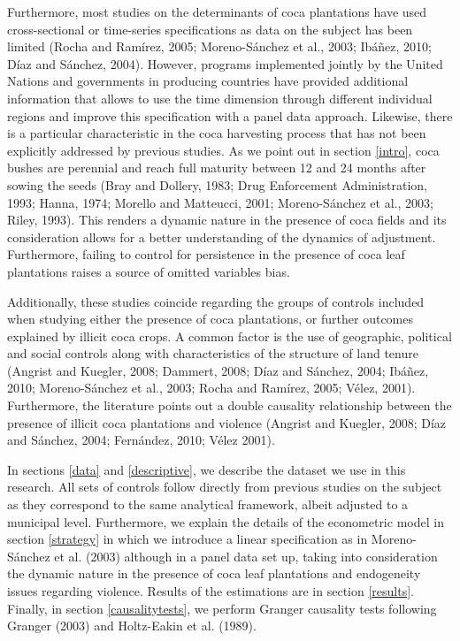 \documentclass[12pt,a4paper,english]{article}%
\begin{document}
Furthermore, most studies on the determinants of coca plantations have used cross-sectional or time-series specifications as data on the subject has been limited (Rocha and Ram\'{i}rez, 2005; Moreno-S\'{a}nchez et al., 2003; Ib\'{a}\~{n}ez, 2010; D\'{i}az and S\'{a}nchez, 2004). However, programs implemented jointly by the United Nations and governments in producing countries have provided additional information that allows to use the time dimension through different individual regions and improve this specification with a panel data approach. Likewise, there is a particular characteristic in the coca harvesting process that has not been explicitly addressed by previous studies. As we point out in section \ref{intro}, coca bushes are perennial and reach full maturity between 12 and 24 months after sowing the seeds (Bray and Dollery, 1983; Drug Enforcement Administration, 1993; Hanna, 1974; Morello and Matteucci, 2001; Moreno-S\'{a}nchez et al., 2003; Riley, 1993). This renders a dynamic nature in the presence of coca fields and its consideration allows for a better understanding of the dynamics of adjustment. Furthermore, failing to control for persistence in the presence of coca leaf plantations raises a source of omitted variables bias.

Additionally, these studies coincide regarding the groups of controls included when studying either the presence of coca plantations, or further outcomes explained by illicit coca crops. A common factor is the use of geographic, political and social controls along with characteristics of the structure of land tenure (Angrist and Kuegler, 2008; Dammert, 2008; D\'{i}az and S\'{a}nchez, 2004; Ib\'{a}\~{n}ez, 2010; Moreno-S\'{a}nchez et al., 2003; Rocha and Ram\'{i}rez, 2005; V\'{e}lez, 2001). Furthermore, the literature points out a double causality relationship between the presence of illicit coca plantations and violence (Angrist and Kuegler, 2008; D\'{i}az and S\'{a}nchez, 2004; Fern\'{a}ndez, 2010; V\'{e}lez 2001). 

In sections \ref{data} and \ref{descriptive}, we describe the dataset we use in this research. All sets of controls follow directly from previous studies on the subject as they correspond to the same analytical framework, albeit adjusted to a municipal level. Furthermore, we explain the details of the econometric model in section \ref{strategy} in which we introduce a linear specification as in Moreno-S\'{a}nchez et al. (2003) although in a panel data set up, taking into consideration the dynamic nature in the presence of coca leaf plantations and endogeneity issues regarding violence. Results of the estimations are in section \ref{results}. Finally, in section \ref{causalitytests}, we perform Granger causality tests following Granger (2003) and Holtz-Eakin et al. (1989).
\end{document}
